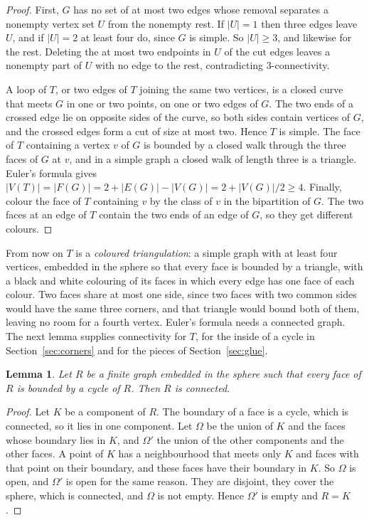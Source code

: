 \documentclass[10pt]{amsart}
\numberwithin{equation}{section}
\newtheorem{lemma}[equation]{Lemma}
\theoremstyle{definition}
\theoremstyle{remark}
\newcommand{\T}{T}
\begin{document}
\begin{proof}
First, $G$ has no set of at most two edges whose removal separates a nonempty vertex set $U$ from the nonempty rest.
If $|U|=1$ then three edges leave $U$, and if $|U|=2$ at least four do, since $G$ is simple.
So $|U|\ge3$, and likewise for the rest.
Deleting the at most two endpoints in $U$ of the cut edges leaves a nonempty part of $U$ with no edge to the rest, contradicting $3$-connectivity.

A loop of $\T$, or two edges of $\T$ joining the same two vertices, is a closed curve that meets $G$ in one or two points, on one or two edges of $G$.
The two ends of a crossed edge lie on opposite sides of the curve, so both sides contain vertices of $G$, and the crossed edges form a cut of size at most two.
Hence $\T$ is simple.
The face of $\T$ containing a vertex $v$ of $G$ is bounded by a closed walk through the three faces of $G$ at $v$, and in a simple graph a closed walk of length three is a triangle.
Euler's formula gives $|V(\T)|=|F(G)|=2+|E(G)|-|V(G)|=2+|V(G)|/2\ge4$.
Finally, colour the face of $\T$ containing $v$ by the class of $v$ in the bipartition of $G$.
The two faces at an edge of $\T$ contain the two ends of an edge of $G$, so they get different colours.
\end{proof}

From now on $\T$ is a \emph{coloured triangulation}: a simple graph with at least four vertices, embedded in the sphere so that every face is bounded by a triangle, with a black and white colouring of its faces in which every edge has one face of each colour.
Two faces share at most one side, since two faces with two common sides would have the same three corners, and that triangle would bound both of them, leaving no room for a fourth vertex.
Euler's formula needs a connected graph.
The next lemma supplies connectivity for $\T$, for the inside of a cycle in Section~\ref{sec:corners} and for the pieces of Section~\ref{sec:glue}.

\begin{lemma}\label{lem:connected}
Let $R$ be a finite graph embedded in the sphere such that every face of $R$ is bounded by a cycle of $R$.
Then $R$ is connected.
\end{lemma}

\begin{proof}
Let $K$ be a component of $R$.
The boundary of a face is a cycle, which is connected, so it lies in one component.
Let $\Omega$ be the union of $K$ and the faces whose boundary lies in $K$, and $\Omega'$ the union of the other components and the other faces.
A point of $K$ has a neighbourhood that meets only $K$ and faces with that point on their boundary, and these faces have their boundary in $K$.
So $\Omega$ is open, and $\Omega'$ is open for the same reason.
They are disjoint, they cover the sphere, which is connected, and $\Omega$ is not empty.
Hence $\Omega'$ is empty and $R=K$.
\end{proof}
\end{document}
